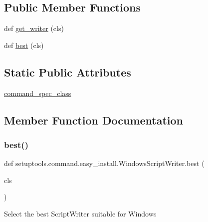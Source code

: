 \subsection*{Public Member Functions}
\begin{DoxyCompactItemize}
\item 
def \hyperlink{classsetuptools_1_1command_1_1easy__install_1_1WindowsScriptWriter_aad977a36fa4162079833bcfd73384f99}{get\+\_\+writer} (cls)
\item 
def \hyperlink{classsetuptools_1_1command_1_1easy__install_1_1WindowsScriptWriter_a0e902494038a088017e95fdfe07b76f1}{best} (cls)
\end{DoxyCompactItemize}
\subsection*{Static Public Attributes}
\begin{DoxyCompactItemize}
\item 
\hyperlink{classsetuptools_1_1command_1_1easy__install_1_1WindowsScriptWriter_ab6b5a19df08d762e4fa963fc6c75e4c8}{command\+\_\+spec\+\_\+class}
\end{DoxyCompactItemize}


\subsection{Member Function Documentation}
\mbox{\label{classsetuptools_1_1command_1_1easy__install_1_1WindowsScriptWriter_a0e902494038a088017e95fdfe07b76f1}} 
\subsubsection{\texorpdfstring{best()}{best()}}
{\footnotesize\ttfamily def setuptools.\+command.\+easy\+\_\+install.\+Windows\+Script\+Writer.\+best (\begin{DoxyParamCaption}\item[{}]{cls }\end{DoxyParamCaption})}

\begin{DoxyVerb}Select the best ScriptWriter suitable for Windows
\end{DoxyVerb}
 \mbox{\label{classsetuptools_1_1command_1_1easy__install_1_1WindowsScriptWriter_aad977a36fa4162079833bcfd73384f99}} 
